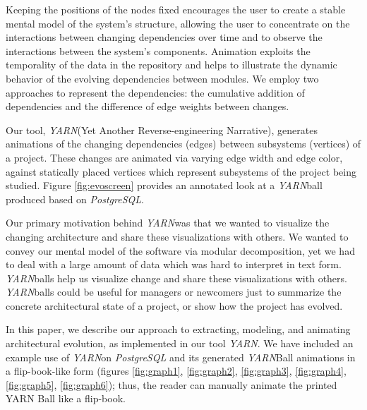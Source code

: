 \documentclass[times, 10pt,twocolumn]{article}
\newcommand{\yarn}{\emph{YARN\xspace}}
\newcommand{\YARN}{\yarn}
\newcommand{\postgresql}{\emph{PostgreSQL}\xspace}
\begin{document}
Keeping the positions of the nodes fixed encourages the user to create
a stable mental model of the system's structure, allowing the user to
concentrate on the interactions between changing dependencies over
time and to observe the interactions between the system's components.
Animation exploits the temporality of the data in the repository and
helps to illustrate the dynamic behavior of the evolving dependencies
between modules.  We employ two approaches to represent the
dependencies: the cumulative addition of dependencies and the
difference of edge weights between changes.


Our tool, \YARN (Yet Another Reverse-engineering Narrative), generates
animations of the changing dependencies (edges) between subsystems
(vertices) of a project.  These changes are animated via
varying edge width and edge color, against statically placed vertices
which represent subsystems of the project being studied. Figure
\ref{fig:evoscreen} provides an annotated look at a \yarn ball
produced based on \postgresql.

Our primary motivation behind \YARN was that we wanted to visualize
the changing architecture and share these visualizations with others.
We wanted to convey our mental model of the
software\cite{holt02software} via modular decomposition, yet we had to
deal with a large amount of data which was hard to interpret in text
form.  \YARN balls help us visualize change and share these
visualizations with others.  \YARN balls could be useful for managers
or newcomers just to summarize the concrete architectural state of a
project, or show how the project has evolved.

In this paper, we describe our approach to extracting, modeling, and
animating architectural evolution, as implemented in our tool \YARN.
We have included an example use of \YARN on \postgresql and its
generated \YARN Ball animations in a flip-book-like form (figures
\ref{fig:graph1}, \ref{fig:graph2}, \ref{fig:graph3},
\ref{fig:graph4}, \ref{fig:graph5}, \ref{fig:graph6}); thus, the
reader can manually animate the printed YARN Ball like a flip-book.
\end{document}

